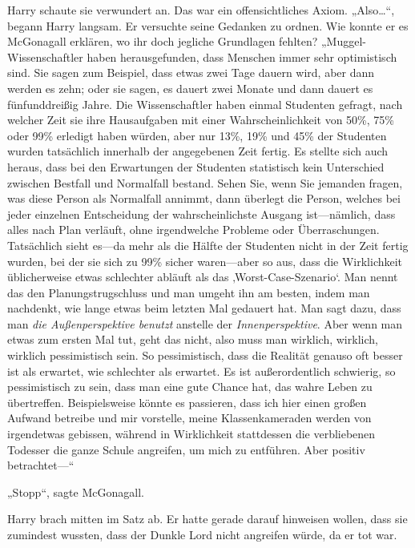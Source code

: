 Harry schaute sie verwundert an. Das war ein offensichtliches Axiom. „Also…“, begann Harry langsam. Er versuchte seine Gedanken zu ordnen. Wie konnte er es McGonagall erklären, wo ihr doch jegliche Grundlagen fehlten? „Muggel-Wissenschaftler haben herausgefunden, dass Menschen immer sehr optimistisch sind. Sie sagen zum Beispiel, dass etwas zwei Tage dauern wird, aber dann werden es zehn; oder sie sagen, es dauert zwei Monate und dann dauert es fünfunddreißig Jahre. Die Wissenschaftler haben einmal Studenten gefragt, nach welcher Zeit sie ihre Hausaufgaben mit einer Wahrscheinlichkeit von 50\%, 75\% oder 99\% erledigt haben würden, aber nur 13\%, 19\% und 45\% der Studenten wurden tatsächlich innerhalb der angegebenen Zeit fertig. Es stellte sich auch heraus, dass bei den Erwartungen der Studenten statistisch kein Unterschied zwischen Bestfall und Normalfall bestand. Sehen Sie, wenn Sie jemanden fragen, was diese Person als Normalfall annimmt, dann überlegt die Person, welches bei jeder einzelnen Entscheidung der wahrscheinlichste Ausgang ist—nämlich, dass alles nach Plan verläuft, ohne irgendwelche Probleme oder Überraschungen. Tatsächlich sieht es—da mehr als die Hälfte der Studenten nicht in der Zeit fertig wurden, bei der sie sich zu 99\% sicher waren—aber so aus, dass die Wirklichkeit üblicherweise etwas schlechter abläuft als das ‚Worst-Case-Szenario‘. Man nennt das den Planungstrugschluss und man umgeht ihn am besten, indem man nachdenkt, wie lange etwas beim letzten Mal gedauert hat. Man sagt dazu, dass man \emph{die Außenperspektive benutzt} anstelle der \emph{Innenperspektive}. Aber wenn man etwas zum ersten Mal tut, geht das nicht, also muss man wirklich, wirklich, wirklich pessimistisch sein. So pessimistisch, dass die Realität genauso oft besser ist als erwartet, wie schlechter als erwartet. Es ist außerordentlich schwierig, so pessimistisch zu sein, dass man eine gute Chance hat, das wahre Leben zu übertreffen. Beispielsweise könnte es passieren, dass ich hier einen großen Aufwand betreibe und mir vorstelle, meine Klassenkameraden werden von irgendetwas gebissen, während in Wirklichkeit stattdessen die verbliebenen Todesser die ganze Schule angreifen, um mich zu entführen. Aber positiv betrachtet—“

„Stopp“, sagte McGonagall.

Harry brach mitten im Satz ab. Er hatte gerade darauf hinweisen wollen, dass sie zumindest wussten, dass der Dunkle Lord nicht angreifen würde, da er tot war.


